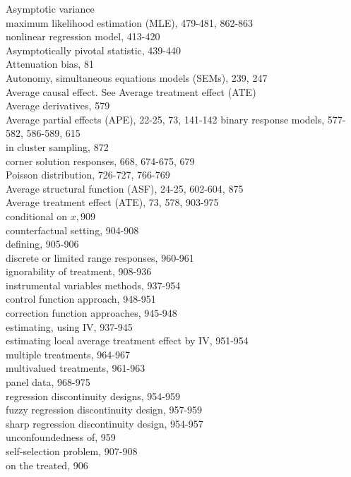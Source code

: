 \documentclass[10pt]{article}
\begin{document}
Asymptotic variance\\
maximum likelihood estimation (MLE), 479-481, 862-863\\
nonlinear regression model, 413-420\\
Asymptotically pivotal statistic, 439-440\\
Attenuation bias, 81\\
Autonomy, simultaneous equations models (SEMs), 239, 247\\
Average causal effect. See Average treatment effect (ATE)\\
Average derivatives, 579\\
Average partial effects (APE), 22-25, 73, 141-142 binary response models, 577-582, 586-589, 615\\
in cluster sampling, 872\\
corner solution responses, 668, 674-675, 679\\
Poisson distribution, 726-727, 766-769\\
Average structural function (ASF), 24-25, 602-604, 875\\
Average treatment effect (ATE), 73, 578, 903-975\\
conditional on $x, 909$\\
counterfactual setting, 904-908\\
defining, 905-906\\
discrete or limited range responses, 960-961\\
ignorability of treatment, 908-936\\
instrumental variables methods, 937-954\\
control function approach, 948-951\\
correction function approaches, 945-948\\
estimating, using IV, 937-945\\
estimating local average treatment effect by IV, 951-954\\
multiple treatments, 964-967\\
multivalued treatments, 961-963\\
panel data, 968-975\\
regression discontinuity designs, 954-959\\
fuzzy regression discontinuity design, 957-959\\
sharp regression discontinuity design, 954-957\\
unconfoundedness of, 959\\
self-selection problem, 907-908\\
on the treated, 906\\
\end{document}
